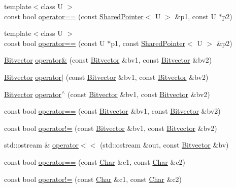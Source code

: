 \begin{DoxyCompactItemize}
\item 
{\footnotesize template$<$class U $>$ }\\const bool \hyperlink{namespaceprism_a2b73e87f080646696ed6b595a3900119}{operator==} (const \hyperlink{classprism_1_1_shared_pointer}{Shared\+Pointer}$<$ U $>$ \&p1, const U $\ast$p2)
\item 
{\footnotesize template$<$class U $>$ }\\const bool \hyperlink{namespaceprism_a1f29b22985dc0ec1fc548a551ce313ed}{operator==} (const U $\ast$p1, const \hyperlink{classprism_1_1_shared_pointer}{Shared\+Pointer}$<$ U $>$ \&p2)
\item 
\hyperlink{classprism_1_1_bitvector}{Bitvector} \hyperlink{namespaceprism_a26b2b2b5b2c5f305badd964c24625b36}{operator\&} (const \hyperlink{classprism_1_1_bitvector}{Bitvector} \&bv1, const \hyperlink{classprism_1_1_bitvector}{Bitvector} \&bv2)
\item 
\hyperlink{classprism_1_1_bitvector}{Bitvector} \hyperlink{namespaceprism_a145d1e196c14cdbdc4eccb01c60c9275}{operator$\vert$} (const \hyperlink{classprism_1_1_bitvector}{Bitvector} \&bv1, const \hyperlink{classprism_1_1_bitvector}{Bitvector} \&bv2)
\item 
\hyperlink{classprism_1_1_bitvector}{Bitvector} \hyperlink{namespaceprism_a6a18ff84f30ae8056d6807056a24ef14}{operator$^\wedge$} (const \hyperlink{classprism_1_1_bitvector}{Bitvector} \&bv1, const \hyperlink{classprism_1_1_bitvector}{Bitvector} \&bv2)
\item 
const bool \hyperlink{namespaceprism_aca036c7f0f8a5aaf98b46b4879189bcc}{operator==} (const \hyperlink{classprism_1_1_bitvector}{Bitvector} \&bv1, const \hyperlink{classprism_1_1_bitvector}{Bitvector} \&bv2)
\item 
const bool \hyperlink{namespaceprism_aca663878d61686ef365f3e51efddc4b4}{operator!=} (const \hyperlink{classprism_1_1_bitvector}{Bitvector} \&bv1, const \hyperlink{classprism_1_1_bitvector}{Bitvector} \&bv2)
\item 
std\+::ostream \& \hyperlink{namespaceprism_a0b98ff0fee78022242292f24158ad1f0}{operator$<$$<$} (std\+::ostream \&out, const \hyperlink{classprism_1_1_bitvector}{Bitvector} \&bv)
\item 
const bool \hyperlink{namespaceprism_a1ba68b64a6cfdcff9e144b8c2476cddb}{operator==} (const \hyperlink{classprism_1_1_char}{Char} \&c1, const \hyperlink{classprism_1_1_char}{Char} \&c2)
\item 
const bool \hyperlink{namespaceprism_a249b6933154570d808cdd405ab1fd89b}{operator!=} (const \hyperlink{classprism_1_1_char}{Char} \&c1, const \hyperlink{classprism_1_1_char}{Char} \&c2)

\end{DoxyCompactItemize}
